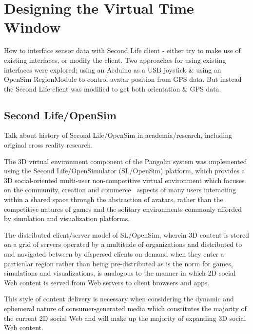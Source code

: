 
\section{Designing the Virtual Time Window}

How to interface sensor data with Second Life client - either try to make use of existing interfaces, or modify the client. Two approaches for using existing interfaces were explored; using an Arduino as a USB joystick \& using an OpenSim RegionModule to control avatar position from GPS data. But instead the Second Life client was modified to get both orientation \& GPS data.


\subsection{Second Life/OpenSim}

Talk about history of Second Life/OpenSim in academia/research, including original cross reality research.

The 3D virtual environment component of the Pangolin system was implemented using the Second Life/OpenSimulator (SL/OpenSim) platform, which provides a 3D social-oriented multi-user non-competitive virtual environment which focuses on the community, creation and commerce~\cite{Sevan2008} aspects of many users interacting within a shared space through the abstraction of avatars, rather than the competitive natures of games and the solitary environments commonly afforded by simulation and visualization platforms.

The distributed client/server model of SL/OpenSim, wherein 3D content is stored on a grid of servers operated by a multitude of organizations and distributed to and navigated between by dispersed clients on demand when they enter a particular region rather than being pre-distributed as is the norm for games, simulations and visualizations, is analogous to the manner in which 2D social Web content is served from Web servers to client browsers and apps.

This style of content delivery is necessary when considering the dynamic and ephemeral nature of consumer-generated media which constitutes the majority of the current 2D social Web and will make up the majority of expanding 3D social Web content.

